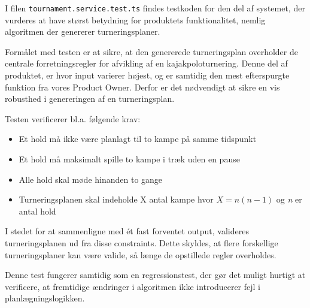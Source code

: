 I filen \texttt{tournament.service.test.ts} findes testkoden for den del af systemet, der vurderes at have størst betydning for produktets funktionalitet, nemlig algoritmen der genererer turneringsplaner.

Formålet med testen er at sikre, at den genererede turneringsplan overholder de centrale forretningsregler for afvikling af en kajakpoloturnering.
Denne del af produktet, er hvor input varierer højest, og er samtidig den mest efterspurgte funktion fra vores Product Owner.
Derfor er det nødvendigt at sikre en vis robusthed i genereringen af en turneringsplan.

Testen verificerer bl.a. følgende krav:

\begin{itemize}
    \item Et hold må ikke være planlagt til to kampe på samme tidspunkt
    \item Et hold må maksimalt spille to kampe i træk uden en pause
    \item Alle hold skal møde hinanden to gange
    \item Turneringsplanen skal indeholde X antal kampe hvor $X = n(n-1)$ og \textit{n} er antal hold
\end{itemize}

I stedet for at sammenligne med ét fast forventet output, valideres turneringsplanen ud fra disse constraints.
Dette skyldes, at flere forskellige turneringsplaner kan være valide, så længe de opstillede regler overholdes.

Denne test fungerer samtidig som en regressionstest, der gør det muligt hurtigt at verificere, at fremtidige ændringer i algoritmen ikke introducerer fejl i planlægningslogikken.